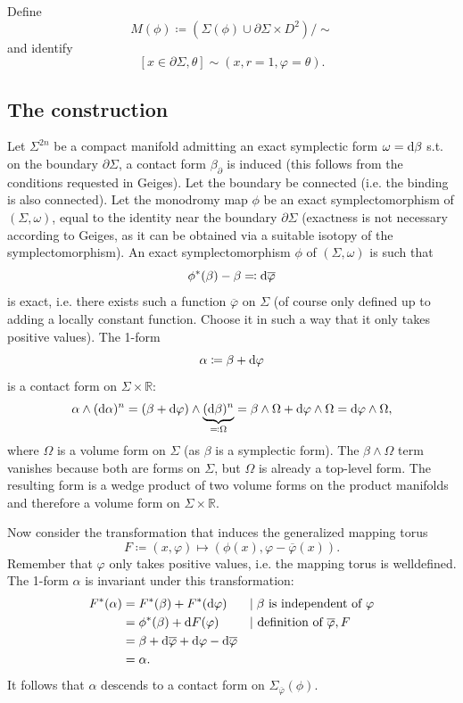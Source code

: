 Define
\[
    M(\phi) \coloneqq \left(\Sigma(\phi) \cup \partial \Sigma \times D^2\right)/\sim
\]
and identify
\[
    [x \in \partial \Sigma, \theta] \sim (x, r=1, \varphi = \theta).
\]


\subsection*{The construction}

Let $\Sigma^{2n}$ be a compact manifold admitting an exact symplectic form $\omega = \mathrm{d} \beta$ s.t. on the boundary $\partial \Sigma$, a contact form $\beta_\partial$ is induced (this follows from the conditions requested in Geiges).
Let the boundary be connected (i.e. the binding is also connected).
Let the monodromy map $\phi$ be an exact symplectomorphism of $(\Sigma, \omega)$,
equal to the identity near the boundary $\partial \Sigma$ (exactness is not necessary according to Geiges, as it can be obtained via a suitable isotopy of the symplectomorphism).
An exact symplectomorphism $\phi$ of $(\Sigma, \omega)$ is such that
\[
    \phi^*(\beta) - \beta \eqqcolon \mathrm{d} \overline{\varphi}  
\]
is exact, i.e. there exists such a function $\overline{\varphi}$ on $\Sigma$ (of course only defined up to adding a locally constant function. Choose it in such a way that it only takes positive values).
The 1-form 
\[
    \alpha \coloneqq \beta + \mathrm{d} \varphi
\]
is a contact form on $\Sigma \times \mathbb R$:
\[
    \alpha \wedge (\mathrm{d} \alpha)^{n} = (\beta + \mathrm{d} \varphi)\wedge \underbrace{(\mathrm{d} \beta)^n}_{\eqqcolon \Omega} = \beta \wedge \Omega + \mathrm{d} \varphi \wedge \Omega = \mathrm{d} \varphi \wedge \Omega,
\]
where $\Omega$ is a volume form on $\Sigma$ (as $\beta$ is a symplectic form).
The $\beta \wedge \Omega$ term vanishes because both are forms on $\Sigma$, but $\Omega$ is already a top-level form.
The resulting form is a wedge product of two volume forms on the product manifolds and therefore a volume form on $\Sigma \times \mathbb R$.

Now consider the transformation that induces the generalized mapping torus
\[
    F \coloneqq (x,\varphi) \mapsto (\phi(x), \varphi - \overline{\varphi}(x)).    
\]
Remember that $\varphi$ only takes positive values, i.e. the mapping torus is welldefined.
The 1-form $\alpha$ is invariant under this transformation:
\begin{align*}
    F^*(\alpha) &= F^*(\beta) + F^*(\mathrm{d} \varphi)&&|\;\beta\text{ is independent of }\varphi\\
    &= \phi^*(\beta) + \mathrm{d} F(\varphi)&&|\text{ definition of }\overline{\varphi}, F\\
    &= \beta + \mathrm{d}\overline{\varphi} + \mathrm{d} \varphi - \mathrm{d} \overline{\varphi}\\
    &= \alpha.
\end{align*}
It follows that $\alpha$ descends to a contact form on $\Sigma_{\overline{\varphi}}(\phi)$. 

